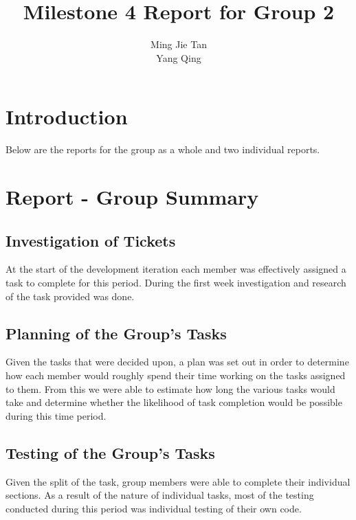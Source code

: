 \documentclass{article}
\begin{document}
\title{\textbf{Milestone 4 Report for Group 2}}\author{Ming Jie Tan \\ Yang Qing }

\maketitle
\thispagestyle{empty}
\newpage{}

\thispagestyle{empty}
\tableofcontents
\newpage{}

\setcounter{page}{1}
\section{Introduction}

Below are the reports for the group as a whole and two individual reports.

\section{Report - Group Summary}

\subsection{Investigation of Tickets}
At the start of the development iteration each member was effectively assigned a task to complete for this period. During the first week investigation and research of the task provided was done.
\subsection{Planning of the Group's Tasks}
Given the tasks that were decided upon, a plan was set out in order to determine how each member would roughly spend their time working on the tasks assigned to them. From this we were able to estimate how long the various tasks would take and determine whether the likelihood of task completion would be possible during this time period.
\subsection{Testing of the Group's Tasks}
Given the split of the task, group members were able to complete their individual sections. As a result of the nature of individual tasks, most of the testing conducted during this period was individual testing of their own code.
\end{document}

